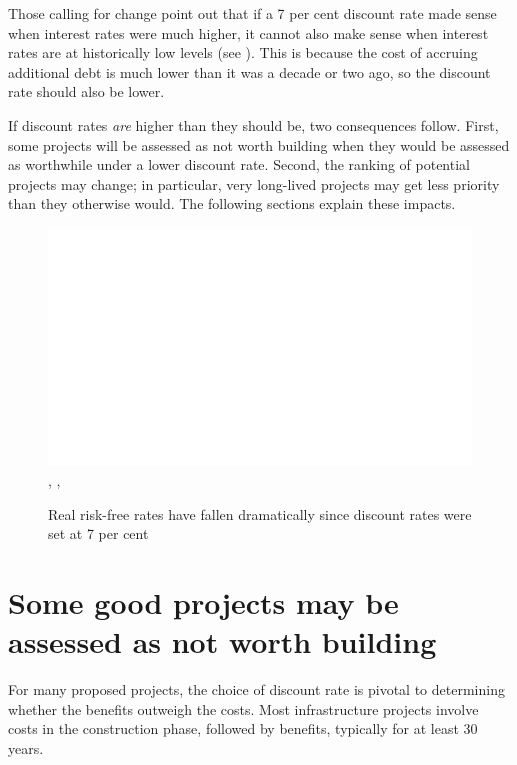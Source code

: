 \documentclass{grattan}
\begin{document}
Those calling for change point out that if a 7 per cent discount rate made sense when interest rates were much higher, it cannot also make sense when interest rates are at historically low levels (see ). This is because the cost of accruing additional debt is much lower than it was a decade or two ago, so the discount rate should also be lower.

If discount rates \emph{are} higher than they should be, two consequences follow. First, some projects will be assessed as not worth building when they would be assessed as worthwhile under a lower discount rate. Second, the ranking of potential projects may change; in particular, very long-lived projects may get less priority than they otherwise would. The following sections explain these impacts.

\begin{figure}
\caption{Real risk-free rates have fallen dramatically since discount rates were set at 7 per cent  \label{fig:risk-free-rate-10-year-government-bond}}%
\includegraphics[page=16]{Charts/ChartPackDiscountRates.pdf}
%
{\textcite{RBA-2018-CPI-table}, \textcite{RBA-2018-Government-bonds-monthly}, \textcite{RBA-2013-Government-bonds-monthly-historical}}
\end{figure}




\section{Some good projects may be assessed as not worth building}\label{subsec:artificially-high-DR-makes-good-projects-not-worthwhile}
For many proposed projects, the choice of discount rate is pivotal to determining whether the benefits outweigh the costs. Most infrastructure projects involve costs in the construction phase, followed by benefits, typically for at least 30 years.
\end{document}
